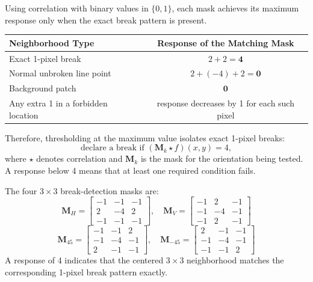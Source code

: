 \documentclass[12pt]{article}
\begin{document}
\begin{stepbox}
Using correlation with binary values in $\{0,1\}$, each mask achieves its maximum response only when the exact break pattern is present.

\begin{center}
\renewcommand{\arraystretch}{1.25}
\small
\begin{tabular}{|l|c|}
\hline
\textbf{Neighborhood Type} & \textbf{Response of the Matching Mask} \\
\hline
Exact 1-pixel break & $2 + 2 = \mathbf{4}$ \\
Normal unbroken line point & $2 + (-4) + 2 = \mathbf{0}$ \\
Background patch & $\mathbf{0}$ \\
Any extra 1 in a forbidden location & response decreases by 1 for each such pixel \\
\hline
\end{tabular}
\normalsize
\end{center}

Therefore, thresholding at the maximum value isolates exact 1-pixel breaks:
\[
\text{declare a break if } (\mathbf{M}_k \star f)(x,y) = 4,
\]
where $\star$ denotes correlation and $\mathbf{M}_k$ is the mask for the orientation being tested. A response below 4 means that at least one required condition fails.
\end{stepbox}

\begin{resultsbox}
The four $3 \times 3$ break-detection masks are:
\[
\boxed{
\mathbf{M}_H = \begin{bmatrix} -1 & -1 & -1 \\ 2 & -4 & 2 \\ -1 & -1 & -1 \end{bmatrix}, \quad
\mathbf{M}_V = \begin{bmatrix} -1 & 2 & -1 \\ -1 & -4 & -1 \\ -1 & 2 & -1 \end{bmatrix}
}
\]
\[
\boxed{
\mathbf{M}_{45} = \begin{bmatrix} -1 & -1 & 2 \\ -1 & -4 & -1 \\ 2 & -1 & -1 \end{bmatrix}, \quad
\mathbf{M}_{-45} = \begin{bmatrix} 2 & -1 & -1 \\ -1 & -4 & -1 \\ -1 & -1 & 2 \end{bmatrix}
}
\]
A response of 4 indicates that the centered $3 \times 3$ neighborhood matches the corresponding 1-pixel break pattern exactly.
\end{resultsbox}
\end{document}
